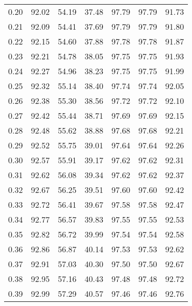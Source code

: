 \begin{tabular}{|c|c|c|c|c|c|c|}
      0.20 &     92.02 &     54.19 &      37.48 &   97.79 &      97.79 &         91.73 \\
      0.21 &     92.09 &     54.41 &      37.69 &   97.79 &      97.79 &         91.80 \\
      0.22 &     92.15 &     54.60 &      37.88 &   97.78 &      97.78 &         91.87 \\
      0.23 &     92.21 &     54.78 &      38.05 &   97.75 &      97.75 &         91.93 \\
      0.24 &     92.27 &     54.96 &      38.23 &   97.75 &      97.75 &         91.99 \\
      0.25 &     92.32 &     55.14 &      38.40 &   97.74 &      97.74 &         92.05 \\
      0.26 &     92.38 &     55.30 &      38.56 &   97.72 &      97.72 &         92.10 \\
      0.27 &     92.42 &     55.44 &      38.71 &   97.69 &      97.69 &         92.15 \\
      0.28 &     92.48 &     55.62 &      38.88 &   97.68 &      97.68 &         92.21 \\
      0.29 &     92.52 &     55.75 &      39.01 &   97.64 &      97.64 &         92.26 \\
      0.30 &     92.57 &     55.91 &      39.17 &   97.62 &      97.62 &         92.31 \\
      0.31 &     92.62 &     56.08 &      39.34 &   97.62 &      97.62 &         92.37 \\
      0.32 &     92.67 &     56.25 &      39.51 &   97.60 &      97.60 &         92.42 \\
      0.33 &     92.72 &     56.41 &      39.67 &   97.58 &      97.58 &         92.47 \\
      0.34 &     92.77 &     56.57 &      39.83 &   97.55 &      97.55 &         92.53 \\
      0.35 &     92.82 &     56.72 &      39.99 &   97.54 &      97.54 &         92.58 \\
      0.36 &     92.86 &     56.87 &      40.14 &   97.53 &      97.53 &         92.62 \\
      0.37 &     92.91 &     57.03 &      40.30 &   97.50 &      97.50 &         92.67 \\
      0.38 &     92.95 &     57.16 &      40.43 &   97.48 &      97.48 &         92.72 \\
      0.39 &     92.99 &     57.29 &      40.57 &   97.46 &      97.46 &         92.76 \\

\end{tabular}
